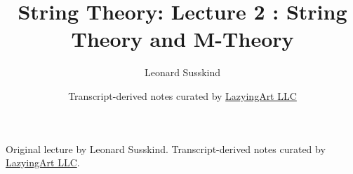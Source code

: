 \documentclass[11pt,oneside]{book}
\begin{document}
\frontmatter
\title{String Theory: Lecture 2 : String Theory and M-Theory}
\author{Leonard Susskind}
\date{Transcript-derived notes curated by \href{https://lazying.art}{LazyingArt LLC}}
\maketitle
\begin{center}
\small Original lecture by Leonard Susskind. Transcript-derived notes curated by \href{https://lazying.art}{LazyingArt LLC}.
\end{center}
\clearpage
\mainmatter

\end{document}
